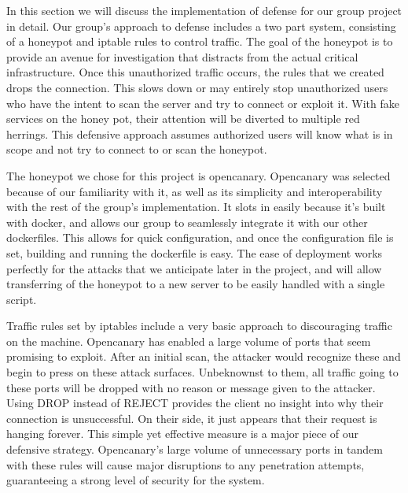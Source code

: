 In this section we will discuss the implementation of defense for our group project in detail. Our group's approach to defense includes a two part system, consisting of a honeypot and iptable rules to control traffic. The goal of the honeypot is to provide an avenue for investigation that distracts from the actual critical infrastructure. Once this unauthorized traffic occurs, the rules that we created drops the connection. This slows down or may entirely stop unauthorized users who have the intent to scan the server and try to connect or exploit it. With fake services on the honey pot, their attention will be diverted to multiple red herrings. This defensive approach assumes authorized users will know what is in scope and not try to connect to or scan the honeypot.

The honeypot we chose for this project is opencanary. Opencanary was selected because of our  familiarity with it, as well as its simplicity and interoperability with the rest of the group's implementation. It slots in easily because it’s built with docker, and allows our group to seamlessly integrate it with our other dockerfiles. This allows for quick configuration, and once the configuration file is set, building and running the dockerfile is easy. The ease of deployment works perfectly for the attacks that we anticipate later in the project, and will allow transferring of the honeypot to a new server to be easily handled with a single script. 

Traffic rules set by iptables include a very basic approach to discouraging traffic on the machine. Opencanary has enabled a large volume of ports that seem promising to exploit. After an initial scan, the attacker would recognize these and begin to press on these attack surfaces. Unbeknownst to them, all traffic going to these ports will be dropped with no reason or message given to the attacker. Using DROP instead of REJECT provides the client no insight into why their connection is unsuccessful. On their side, it just appears that their request is hanging forever. This simple yet effective measure is a major piece of our defensive strategy. Opencanary’s large volume of unnecessary ports in tandem with these rules will cause major disruptions to any penetration attempts, guaranteeing a strong level of security for the system. 
